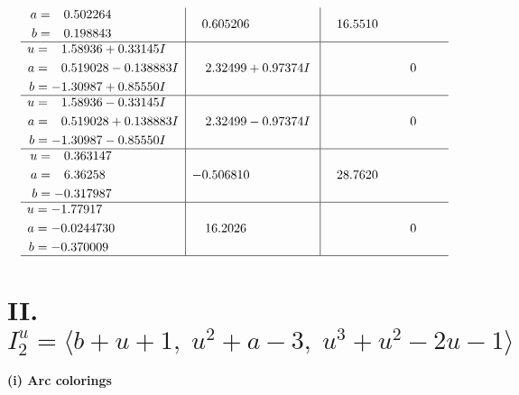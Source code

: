 \documentclass[1p]{elsarticle_modified}
\theoremstyle{definition}
\begin{document}
$$\begin{array}{c|c|c}
\begin{aligned}
a &= \phantom{-}0.502264\phantom{ +0.000000I} \\
b &= \phantom{-}0.198843\phantom{ +0.000000I}\end{aligned}
 & \phantom{-}0.605206\phantom{ +0.000000I} & \phantom{-}16.5510\phantom{ +0.000000I} \\ \hline\begin{aligned}
u &= \phantom{-}1.58936 + 0.33145 I \\
a &= \phantom{-}0.519028 - 0.138883 I \\
b &= -1.30987 + 0.85550 I\end{aligned}
 & \phantom{-}2.32499 + 0.97374 I & \phantom{-0.000000 } 0 \\ \hline\begin{aligned}
u &= \phantom{-}1.58936 - 0.33145 I \\
a &= \phantom{-}0.519028 + 0.138883 I \\
b &= -1.30987 - 0.85550 I\end{aligned}
 & \phantom{-}2.32499 - 0.97374 I & \phantom{-0.000000 } 0 \\ \hline\begin{aligned}
u &= \phantom{-}0.363147\phantom{ +0.000000I} \\
a &= \phantom{-}6.36258\phantom{ +0.000000I} \\
b &= -0.317987\phantom{ +0.000000I}\end{aligned}
 & -0.506810\phantom{ +0.000000I} & \phantom{-}28.7620\phantom{ +0.000000I} \\ \hline\begin{aligned}
u &= -1.77917\phantom{ +0.000000I} \\
a &= -0.0244730\phantom{ +0.000000I} \\
b &= -0.370009\phantom{ +0.000000I}\end{aligned}
 & \phantom{-}16.2026\phantom{ +0.000000I} & \phantom{-0.000000 } 0\\
 \hline 
 \end{array}$$\newpage\newpage\renewcommand{\arraystretch}{1}
\centering \section*{II. $I^u_{2}= \langle b+u+1,\;u^2+a-3,\;u^3+u^2-2 u-1 \rangle$}
\flushleft \textbf{(i) Arc colorings}\\
\end{document}
